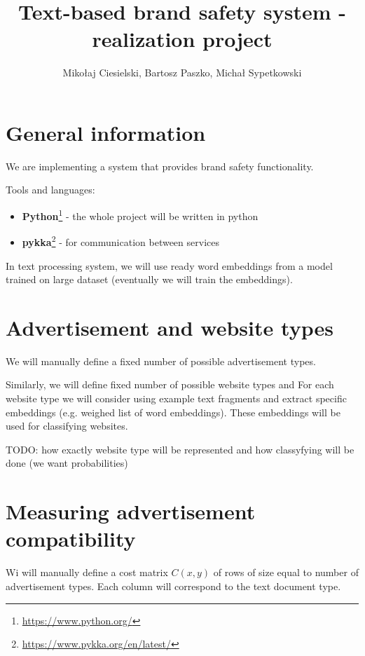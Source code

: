 \documentclass[a4paper]{article}
\begin{document}
\title{Text-based brand safety system - realization project}

\author{Mikołaj Ciesielski, Bartosz Paszko, Michał Sypetkowski}
\maketitle

\section{General information}

We are implementing a system
that provides brand safety functionality.

Tools and languages:
\begin{itemize}
    \item \textbf{Python}\footnote{\url{https://www.python.org/}}
        - the whole project will be written in python
    \item \textbf{pykka}\footnote{\url{https://www.pykka.org/en/latest/}}
        - for communication between services
\end{itemize}

In text processing system, we will use ready word embeddings
from a model trained on large dataset (eventually we will train the embeddings).


\section{Advertisement and website types}

We will manually define a fixed number of possible advertisement types.

Similarly, we will define fixed number of possible website types and 
For each website type we will consider using example
text fragments and extract specific embeddings
(e.g. weighed list of word embeddings).
These embeddings will be used for classifying websites.

TODO: how exactly website type will be
represented and how classyfying will be done (we want probabilities)

\section{Measuring advertisement compatibility}

Wi will manually define a cost matrix $C(x, y)$ of rows
of size equal to number of advertisement types.
Each column will correspond to the text document type.
\end{document}
